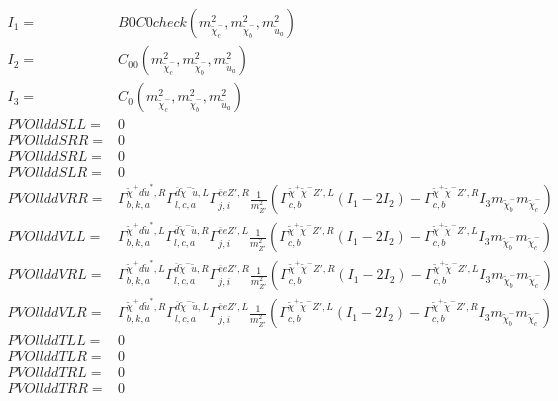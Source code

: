 \documentclass[A4,landscape]{article}
\begin{document}
\begin{align} 
I_1= & B0C0check(m^2_{\tilde{\chi}^-_{{c}}}, m^2_{\tilde{\chi}^-_{{b}}}, m^2_{\tilde{u}_{{a}}}) \\ 
I_2= & C_{00}(m^2_{\tilde{\chi}^-_{{c}}}, m^2_{\tilde{\chi}^-_{{b}}}, m^2_{\tilde{u}_{{a}}}) \\ 
I_3= & C_0(m^2_{\tilde{\chi}^-_{{c}}}, m^2_{\tilde{\chi}^-_{{b}}}, m^2_{\tilde{u}_{{a}}}) \\ 
  PVOllddSLL= & 0 \\ 
  PVOllddSRR= & 0 \\ 
  PVOllddSRL= & 0 \\ 
  PVOllddSLR= & 0 \\ 
  PVOllddVRR= &  \Gamma^{\tilde{\chi}^+d \tilde{u}^*,R}_{b, k, a} \Gamma^{\bar{d}\tilde{\chi}^- \tilde{u} ,L}_{l, c, a} \Gamma^{\bar{e}e {Z'} ,R}_{j, i} \frac{1}{m^2_{{Z'}}} (\Gamma^{\tilde{\chi}^+\tilde{\chi}^- {Z'} ,L}_{c, b} (I_1 - 2 I_2) - \Gamma^{\tilde{\chi}^+\tilde{\chi}^- {Z'} ,R}_{c, b} I_3 m_{\tilde{\chi}^-_{{b}}} m_{\tilde{\chi}^-_{{c}}}) \\ 
  PVOllddVLL= &  \Gamma^{\tilde{\chi}^+d \tilde{u}^*,L}_{b, k, a} \Gamma^{\bar{d}\tilde{\chi}^- \tilde{u} ,R}_{l, c, a} \Gamma^{\bar{e}e {Z'} ,L}_{j, i} \frac{1}{m^2_{{Z'}}} (\Gamma^{\tilde{\chi}^+\tilde{\chi}^- {Z'} ,R}_{c, b} (I_1 - 2 I_2) - \Gamma^{\tilde{\chi}^+\tilde{\chi}^- {Z'} ,L}_{c, b} I_3 m_{\tilde{\chi}^-_{{b}}} m_{\tilde{\chi}^-_{{c}}}) \\ 
  PVOllddVRL= &  \Gamma^{\tilde{\chi}^+d \tilde{u}^*,L}_{b, k, a} \Gamma^{\bar{d}\tilde{\chi}^- \tilde{u} ,R}_{l, c, a} \Gamma^{\bar{e}e {Z'} ,R}_{j, i} \frac{1}{m^2_{{Z'}}} (\Gamma^{\tilde{\chi}^+\tilde{\chi}^- {Z'} ,R}_{c, b} (I_1 - 2 I_2) - \Gamma^{\tilde{\chi}^+\tilde{\chi}^- {Z'} ,L}_{c, b} I_3 m_{\tilde{\chi}^-_{{b}}} m_{\tilde{\chi}^-_{{c}}}) \\ 
  PVOllddVLR= &  \Gamma^{\tilde{\chi}^+d \tilde{u}^*,R}_{b, k, a} \Gamma^{\bar{d}\tilde{\chi}^- \tilde{u} ,L}_{l, c, a} \Gamma^{\bar{e}e {Z'} ,L}_{j, i} \frac{1}{m^2_{{Z'}}} (\Gamma^{\tilde{\chi}^+\tilde{\chi}^- {Z'} ,L}_{c, b} (I_1 - 2 I_2) - \Gamma^{\tilde{\chi}^+\tilde{\chi}^- {Z'} ,R}_{c, b} I_3 m_{\tilde{\chi}^-_{{b}}} m_{\tilde{\chi}^-_{{c}}}) \\ 
  PVOllddTLL= & 0 \\ 
  PVOllddTLR= & 0 \\ 
  PVOllddTRL= & 0 \\ 
  PVOllddTRR= & 0 \\ 
\end{align} 
\end{document}
